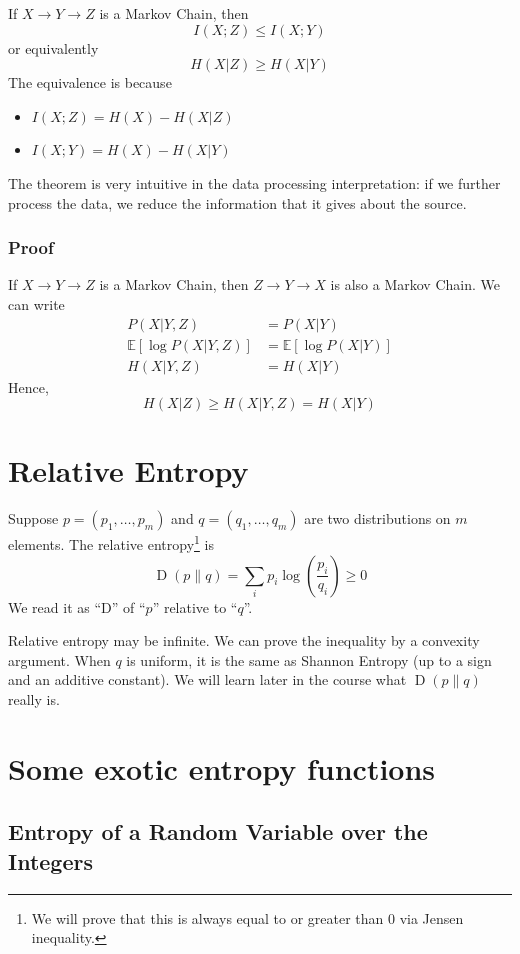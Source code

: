 \documentclass{article}
\begin{document}
If $X\to Y\to Z$ is a Markov Chain, then 
\[
I(X;Z) \leq I(X;Y)
\]
or equivalently
\[
H(X|Z) \geq H(X|Y)
\]
The equivalence is because 
\begin{itemize}
    \item $I(X;Z)=H(X)-H(X|Z)$
    \item $I(X;Y)=H(X)-H(X|Y)$
\end{itemize}
The theorem is very intuitive in the data processing interpretation: if we further process the data, we reduce the information that it gives about the source.

\subsubsection{Proof}

If $X\to Y\to Z$ is a Markov Chain, then $Z\to Y\to X$ is also a Markov Chain. We can write 
\begin{align*}
    P(X|Y,Z) &= P(X|Y)\\
    \mathbb{E}\left[\log P(X|Y,Z)\right] &= \mathbb{E}\left[\log P(X|Y)\right]\\
    H(X|Y,Z) &= H(X|Y)
\end{align*}
Hence,
\[
H(X|Z) \geq H(X|Y,Z) = H(X|Y)
\]

\section{Relative Entropy}

Suppose $p=\left(p_1,\ldots, p_m\right)$ and $q=\left(q_1,\ldots, q_m\right)$ are two distributions on $m$ elements. The relative entropy\footnote{We will prove that this is always equal to or greater than 0 via Jensen inequality.} is 
\[
\operatorname{D}\left(p\| q\right)=\sum_i p_i\log \left(\frac{p_i}{q_i}\right)\geq 0
\]
We read it as ``D'' of ``$p$'' relative to ``$q$''.

Relative entropy may be infinite. We can prove the inequality by a convexity argument. When $q$ is uniform, it is the same as Shannon Entropy (up to a sign and an additive constant). We will learn later in the course what $\operatorname{D}\left(p\| q\right)$ really is.

\section{Some exotic entropy functions}

\subsection{Entropy of a Random Variable over the Integers}
\end{document}
